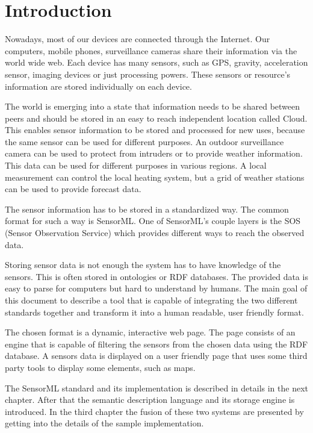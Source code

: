 \chapter*{Introduction}

Nowadays, most of our devices are connected through the Internet. Our computers, mobile phones, surveillance cameras share their information via the world wide web. Each device has many sensors, such as GPS, gravity, acceleration sensor, imaging devices or just processing powers. These sensors or resource's information are stored individually on each device. 

The world is emerging into a state that information needs to be shared between peers and should be stored in an easy to reach independent location called Cloud. 
This enables sensor information to be stored and processed for new uses, because the same sensor can be used for different purposes. An outdoor surveillance camera can be used to protect from intruders or to provide weather information. This data can be used for different purposes in various regions. A local measurement can control the local heating system, but a grid of weather stations can be used to provide forecast data.
 
 The sensor information has to be stored in a standardized way. The common format for such a way is SensorML. One of SensorML's couple layers is the SOS (Sensor Observation Service) which provides different ways to reach the observed data.

Storing sensor data is not enough the system has to have knowledge of the sensors. This is often stored in ontologies or RDF databases.
The provided data is easy to parse for computers but hard to understand by humans.  The main goal of this document to describe a tool that is capable of integrating the two different standards together and transform it into a human readable, user friendly format. 

The chosen format is a dynamic, interactive web page. The page consists of an engine that is capable of filtering the sensors from the chosen data using the RDF database. A sensors data is displayed on a user friendly page that uses some third party tools to display some elements, such as maps.

The SensorML standard and its implementation is described in details in the next chapter. After that the semantic description language and its storage engine is introduced. In the third chapter the fusion of these two systems are presented by getting into the details of the sample implementation.

